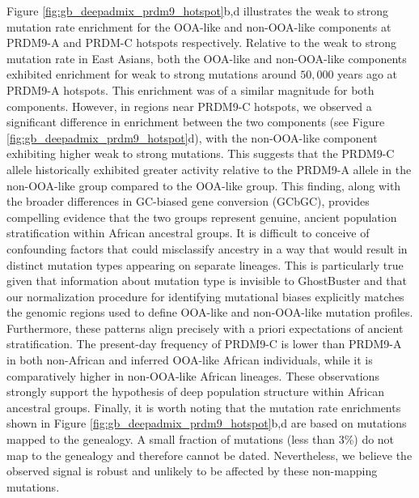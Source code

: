 Figure \ref{fig:gb_deepadmix_prdm9_hotspot}b,d illustrates the weak to strong mutation rate enrichment for the OOA-like and non-OOA-like components at PRDM9-A and PRDM-C hotspots respectively. Relative to the weak to strong mutation rate in East Asians, both the OOA-like and non-OOA-like components exhibited enrichment for weak to strong mutations around $50{,}000$ years ago at PRDM9-A hotspots. 
%
This enrichment was of a similar magnitude for both components. However, in regions near PRDM9-C hotspots, we observed a significant difference in enrichment between the two components (see Figure \ref{fig:gb_deepadmix_prdm9_hotspot}d), with the non-OOA-like component exhibiting higher weak to strong mutations. This suggests that the PRDM9-C allele historically exhibited greater activity relative to the PRDM9-A allele in the non-OOA-like group compared to the OOA-like group.
%
This finding, along with the broader differences in GC-biased gene conversion (GCbGC), provides compelling evidence that the two groups represent genuine, ancient population stratification within African ancestral groups. It is difficult to conceive of confounding factors that could misclassify ancestry in a way that would result in distinct mutation types appearing on separate lineages. This is particularly true given that information about mutation type is invisible to GhostBuster and that our normalization procedure for identifying mutational biases explicitly matches the genomic regions used to define OOA-like and non-OOA-like mutation profiles.
%
Furthermore, these patterns align precisely with a priori expectations of ancient stratification. The present-day frequency of PRDM9-C is lower than PRDM9-A in both non-African and inferred OOA-like African individuals, while it is comparatively higher in non-OOA-like African lineages. These observations strongly support the hypothesis of deep population structure within African ancestral groups.
Finally, it is worth noting that the mutation rate enrichments shown in Figure \ref{fig:gb_deepadmix_prdm9_hotspot}b,d are based on mutations mapped to the genealogy. A small fraction of mutations (less than $3$\%) do not map to the genealogy and therefore cannot be dated. Nevertheless, we believe the observed signal is robust and unlikely to be affected by these non-mapping mutations.

